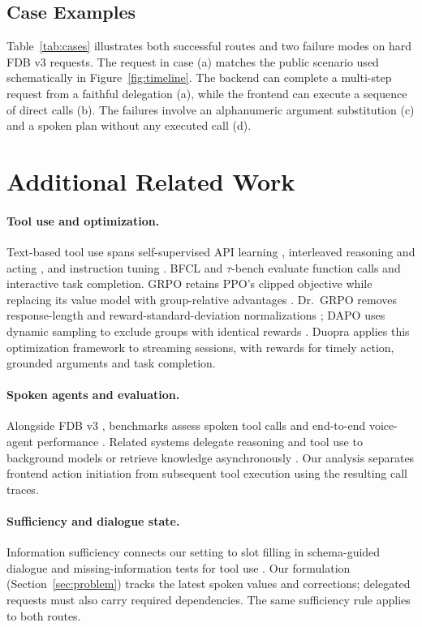 \subsection{Case Examples}
\label{app:cases}

Table~\ref{tab:cases} illustrates both successful routes and two failure modes on hard FDB v3 requests. The request in case (a) matches the public  scenario used schematically in Figure~\ref{fig:timeline}. The backend can complete a multi-step request from a faithful delegation (a), while the frontend can execute a sequence of direct calls (b). The failures involve an alphanumeric argument substitution (c) and a spoken plan without any executed call (d). 

\section{Additional Related Work}
\label{app:related}

\paragraph{Tool use and optimization.}
Text-based tool use spans self-supervised API learning \citep{schick2023toolformer}, interleaved reasoning and acting \citep{yao2023react}, and instruction tuning \citep{qin2024toolllm}.
BFCL \citep{patil2025bfcl} and $\tau$-bench \citep{yao2024taubench} evaluate function calls and interactive task completion.
GRPO retains PPO's clipped objective \citep{schulman2017ppo} while replacing its value model with group-relative advantages \citep{shao2024deepseekmath}.
Dr.~GRPO removes response-length and reward-standard-deviation normalizations \citep{liu2025drgrpo}; DAPO uses dynamic sampling to exclude groups with identical rewards \citep{yu2026dapo}.
Duopra applies this optimization framework to streaming sessions, with rewards for timely action, grounded arguments and task completion.

\paragraph{Spoken agents and evaluation.}
Alongside FDB v3 \citep{lin2026fdbv3}, benchmarks assess spoken tool calls \citep{voiceagentbench2025,audio2tool2026} and end-to-end voice-agent performance \citep{ray2026tauvoice,bogavelli2026evabench}.
Related systems delegate reasoning and tool use to background models \citep{thinkingmachines2026interactionmodels,orantqing2026gander} or retrieve knowledge asynchronously \citep{chien2026moshirag}.
Our analysis separates frontend action initiation from subsequent tool execution using the resulting call traces.

\paragraph{Sufficiency and dialogue state.}
Information sufficiency connects our setting to slot filling in schema-guided dialogue \citep{rastogi2020sgd} and missing-information tests for tool use \citep{patil2025bfcl,lu2025toolsandbox}.
Our formulation (Section~\ref{sec:problem}) tracks the latest spoken values and corrections; delegated requests must also carry required dependencies. The same sufficiency rule applies to both routes.
